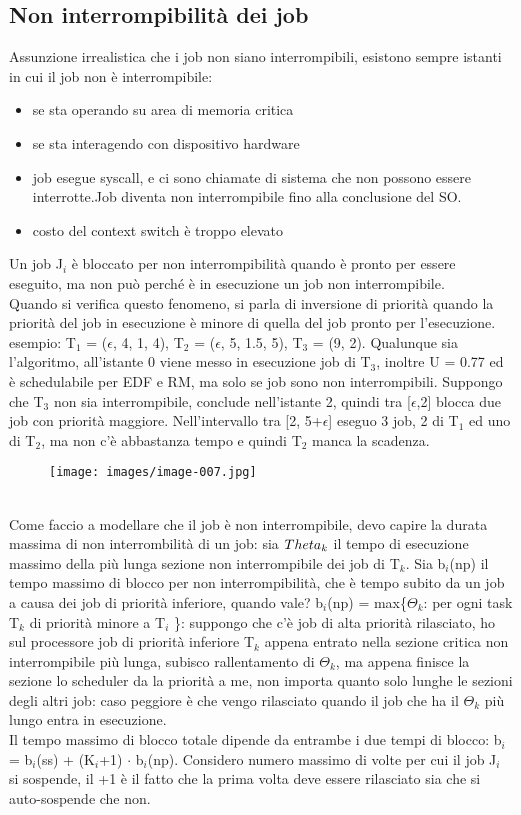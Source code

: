 \documentclass[12pt, oneside]{extbook}
\begin{document}
\subsection{Non interrompibilità dei job}
Assunzione irrealistica che i job non siano interrompibili, esistono sempre istanti in cui il job non è interrompibile:
\begin{itemize}
\item se sta operando su area di memoria critica
\item se sta interagendo con dispositivo hardware
\item job esegue syscall, e ci sono chiamate di sistema che non possono essere interrotte.Job diventa non interrompibile fino alla conclusione del SO.
\item costo del context switch è troppo elevato
\end{itemize}
Un job J$_{i}$ è bloccato per non interrompibilità quando è  pronto per essere eseguito, ma non può perché è in esecuzione un job non interrompibile.\\ Quando si verifica questo fenomeno, si parla di inversione di priorità quando la priorità del job in esecuzione è minore di quella del job pronto per l'esecuzione. esempio: T$_{1}$ = ($\epsilon$, 4, 1, 4), T$_{2}$ = ($\epsilon$, 5, 1.5, 5), T$_{3}$ = (9, 2). Qualunque sia l'algoritmo, all'istante 0 viene messo in esecuzione job di T$_{3}$, inoltre U = 0.77 ed è schedulabile per EDF e RM, ma solo se job sono non interrompibili. Suppongo che T$_{3}$ non sia interrompibile, conclude nell'istante 2, quindi tra [$\epsilon$,2] blocca due job con priorità maggiore. Nell'intervallo tra [2, 5+$\epsilon$] eseguo 3 job, 2 di T$_{1}$ ed uno di T$_{2}$, ma non c'è abbastanza tempo e quindi T$_{2}$ manca la scadenza.\\ 
\begin{figure}[!h]
\centering
\texttt{[image: images/image-007.jpg]}
\end{figure}
\\Come faccio a modellare che il job è non interrompibile, devo capire la durata massima di non interrombilità di un job: sia $\\Theta_{k}$ il tempo di esecuzione massimo della più lunga sezione non interrompibile dei job di T$_{k}$. Sia b$_{i}$(np) il tempo massimo di blocco per non interrompibilità, che è tempo subito da un job a causa dei job di priorità inferiore, quando vale? b$_{i}$(np) = max\{$\Theta_{k}$: per ogni task T$_{k}$ di priorità minore a T$_{i}$ \}: suppongo che c'è job di alta priorità rilasciato, ho sul processore job di priorità inferiore T$_{k}$ appena entrato nella sezione critica non interrompibile più lunga, subisco rallentamento di $\Theta_{k}$, ma appena finisce la sezione lo scheduler da la priorità a me, non importa quanto solo lunghe le sezioni degli altri job: caso peggiore è che vengo rilasciato quando il job che ha il $\Theta_{k}$ più lungo entra in esecuzione.\\ Il tempo massimo di blocco totale dipende da entrambe i due tempi di blocco:
b$_{i}$ = b$_{i}$(ss) + (K$_{i}$+1) $\cdot$ b$_{i}$(np). Considero numero massimo di volte per cui il job J$_{i}$ si sospende, il +1 è il fatto che la prima volta deve essere rilasciato sia che si auto-sospende che non.
\end{document}
